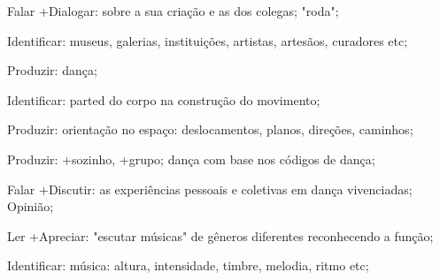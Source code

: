  Falar +Dialogar: sobre a sua criação e as dos colegas; "roda";

 Identificar: museus, galerias, instituições, artistas, artesãos, curadores etc;

 Produzir: dança;

 Identificar: parted do corpo na construção do movimento; 

 Produzir: orientação no espaço: deslocamentos, planos, direções, caminhos;

 Produzir: +sozinho, +grupo; dança com base nos códigos de dança; 

 Falar +Discutir: as experiências pessoais e coletivas em dança vivenciadas; Opinião;

 Ler +Apreciar: "escutar músicas" de gêneros diferentes reconhecendo a função;

 Identificar: música: altura, intensidade, timbre, melodia, ritmo etc; 

